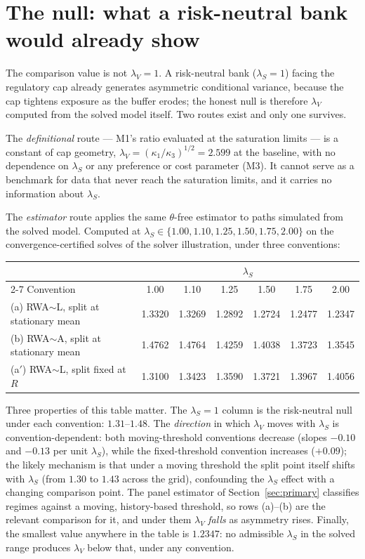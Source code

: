\documentclass[11pt]{article}
\newcommand{\lamV}{\lambda_V}
\newcommand{\lamS}{\lambda_S}
\begin{document}
\section{The null: what a risk-neutral bank would already show}
\label{sec:null}

The comparison value is not $\lamV=1$. A risk-neutral bank
($\lamS=1$) facing the regulatory cap already generates asymmetric
conditional variance, because the cap tightens exposure as the buffer
erodes; the honest null is therefore $\lamV$ computed from the solved
model itself. Two routes exist and only one survives.

The \emph{definitional} route --- M1's ratio evaluated at the
saturation limits --- is a constant of cap geometry,
$\lamV = (\kappa_1/\kappa_3)^{1/2} = 2.599$ at the baseline, with no
dependence on $\lamS$ or any preference or cost parameter
(M3). It cannot serve as a benchmark for data that never
reach the saturation limits, and it carries no information about
$\lamS$.

The \emph{estimator} route applies the same $\theta$-free estimator to
paths simulated from the solved model. Computed at
$\lamS\in\{1.00, 1.10, 1.25, 1.50, 1.75, 2.00\}$ on the
convergence-certified solves of the solver illustration, under three
conventions:

\begin{center}
\begin{tabular}{lcccccc}
\toprule
& \multicolumn{6}{c}{$\lamS$} \\
\cmidrule(lr){2-7}
Convention & 1.00 & 1.10 & 1.25 & 1.50 & 1.75 & 2.00 \\
\midrule
(a) RWA$\sim$L, split at stationary mean & 1.3320 & 1.3269 & 1.2892 & 1.2724 & 1.2477 & 1.2347 \\
(b) RWA$\sim$A, split at stationary mean & 1.4762 & 1.4764 & 1.4259 & 1.4038 & 1.3723 & 1.3545 \\
(a$'$) RWA$\sim$L, split fixed at $R$ & 1.3100 & 1.3423 & 1.3590 & 1.3721 & 1.3967 & 1.4056 \\
\bottomrule
\end{tabular}
\end{center}

Three properties of this table matter. The $\lamS=1$ column is the
risk-neutral null under each convention: $1.31$--$1.48$. The
\emph{direction} in which $\lamV$ moves with $\lamS$ is
convention-dependent: both moving-threshold conventions decrease
(slopes $-0.10$ and $-0.13$ per unit $\lamS$), while the fixed-threshold
convention increases ($+0.09$); the likely mechanism is that under a
moving threshold the split point itself shifts with $\lamS$ (from
$1.30$ to $1.43$ across the grid), confounding the $\lamS$ effect with a
changing comparison point. The panel estimator of
Section~\ref{sec:primary} classifies regimes against a moving,
history-based threshold, so rows (a)--(b) are the relevant comparison
for it, and under them $\lamV$ \emph{falls} as asymmetry rises. Finally,
the smallest value anywhere in the table is $1.2347$: no admissible
$\lamS$ in the solved range produces $\lamV$ below that, under any
convention.
\end{document}
